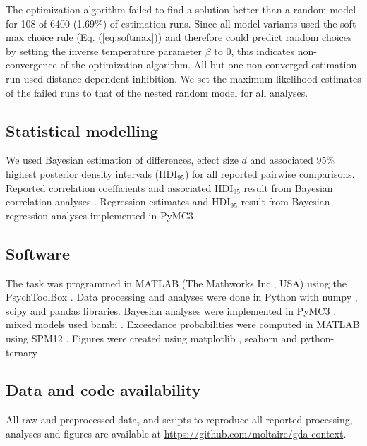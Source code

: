 \documentclass[11pt, a4paper]{article}
\begin{document}
The optimization algorithm failed to find a solution better than a random model for 108 of 6400 (1.69\%) of estimation runs. Since all model variants used the soft-max choice rule (Eq. (\ref{eq:softmax})) and therefore could predict random choices by setting the inverse temperature parameter $\beta$ to 0, this indicates non-convergence of the optimization algorithm. All but one non-converged estimation run used distance-dependent inhibition. We set the maximum-likelihood estimates of the failed runs to that of the nested random model for all analyses.

\subsection*{Statistical modelling}
We used Bayesian estimation \parencite[BEST;][]{kruschke2013BayesianEstimationSupersedes,kruschke2014DoingBayesianData} of differences, effect size $d$ and associated 95\% highest posterior density intervals (HDI$_{95}$) for all reported pairwise comparisons. Reported correlation coefficients and associated HDI$_{95}$ result from Bayesian correlation analyses \parencite{lee2013BayesianCognitiveModeling}. Regression estimates and HDI$_{95}$ result from Bayesian regression analyses implemented in PyMC3 \parencite{salvatier2016ProbabilisticProgrammingPython}.

\subsection*{Software}
The task was programmed in MATLAB (The Mathworks Inc., USA) using the PsychToolBox \parencite{brainard1997psychophysics}. Data processing and analyses were done in Python with numpy \parencite{harris2020array}, scipy \parencite{jones2001SciPyOpenSource} and pandas \parencite{mckinney2012PythonDataAnalysis} libraries. Bayesian analyses were implemented in PyMC3 \parencite{salvatier2016ProbabilisticProgrammingPython}, mixed models used bambi \parencite{yarkoni2016BambiSimpleInterface}. Exceedance probabilities were computed in MATLAB using SPM12 \parencite{penny2011statistical}. Figures were created using matplotlib \parencite{hunter2007Matplotlib2DGraphics}, seaborn \parencite{waskom2020seaborn} and python-ternary \parencite{pythonternary}.

\subsection*{Data and code availability}
All raw and preprocessed data, and scripts to reproduce all reported processing, analyses and figures are available at \hyperlink{https://github.com/moltaire/gda-context}{https://github.com/moltaire/gda-context}.
\end{document}
